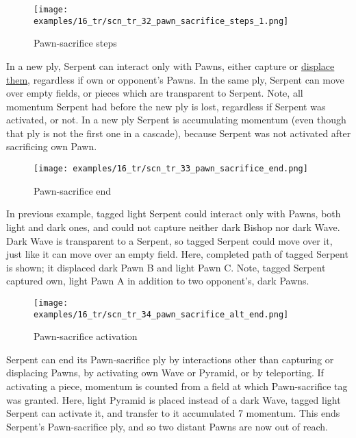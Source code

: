 \noindent
\begin{wrapfigure}[16]{l}{0.4\textwidth}
\centering
\texttt{[image: examples/16\_tr/scn\_tr\_32\_pawn\_sacrifice\_steps\_1.png]}
\vspace*{-0.4\baselineskip}
\caption{Pawn-sacrifice steps}
\label{fig:scn_tr_32_pawn_sacrifice_steps_1}
\end{wrapfigure}
In a new ply, Serpent can interact only with Pawns, either capture or
\hyperref[fig:scn_tr_20_displacement_step_1]{displace them}, regardless if own or
opponent's Pawns. In the same ply, Serpent can move over empty fields, or pieces
which are transparent to Serpent.\newline
\indent
Note, all momentum Serpent had before the new ply is lost, regardless if Serpent
was activated, or not. In a new ply Serpent is accumulating momentum (even though
that ply is not the first one in a cascade), because Serpent was not activated after
sacrificing own Pawn.

\clearpage %

\vspace*{-1.7\baselineskip}
\noindent
\begin{wrapfigure}[15]{l}{0.4\textwidth}
\centering
\texttt{[image: examples/16\_tr/scn\_tr\_33\_pawn\_sacrifice\_end.png]}
\vspace*{-0.4\baselineskip}
\caption{Pawn-sacrifice end}
\label{fig:scn_tr_33_pawn_sacrifice_end}
\end{wrapfigure}
In previous example, tagged light Serpent could interact only with Pawns, both light
and dark ones, and  could not capture neither dark Bishop nor dark Wave. Dark Wave
is transparent to a Serpent, so tagged Serpent could move over it, just like it can
move over an empty field.\newline
\indent
Here, completed path of tagged Serpent is shown; it displaced dark Pawn B and light
Pawn C. Note, tagged Serpent captured own, light Pawn A in addition to two opponent's,
dark Pawns.

\noindent
\begin{wrapfigure}[15]{l}{0.4\textwidth}
\centering
\texttt{[image: examples/16\_tr/scn\_tr\_34\_pawn\_sacrifice\_alt\_end.png]}
\vspace*{-0.4\baselineskip}
\caption{Pawn-sacrifice activation}
\label{fig:scn_tr_34_pawn_sacrifice_alt_end}
\end{wrapfigure}
Serpent can end its Pawn-sacrifice ply by interactions other than capturing or
displacing Pawns, by activating own Wave or Pyramid, or by teleporting. If activating
a piece, momentum is counted from a field at which Pawn-sacrifice tag was granted.\newline
\indent
Here, light Pyramid is placed instead of a dark Wave, tagged light Serpent can activate
it, and transfer to it accumulated 7 momentum. This ends Serpent's Pawn-sacrifice ply,
and so two distant Pawns are now out of reach.

